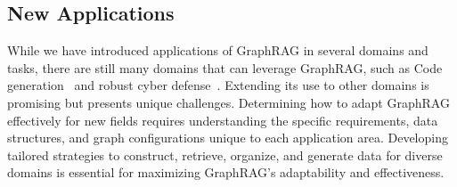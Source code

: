 \subsection{New Applications} While we have introduced applications of GraphRAG in several domains and tasks, there are still many domains that can leverage GraphRAG, such as Code generation~\cite{liu2024codexgraph} and robust cyber defense~\cite{rahman2024retrieval}. Extending its use to other domains is promising but presents unique challenges. Determining how to adapt GraphRAG effectively for new fields requires understanding the specific requirements, data structures, and graph configurations unique to each application area. Developing tailored strategies to construct, retrieve, organize, and generate data for diverse domains is essential for maximizing GraphRAG’s adaptability and effectiveness.

     
    
    
